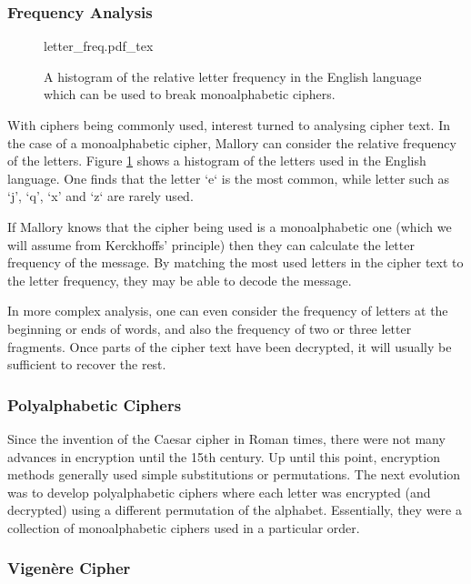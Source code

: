 \subsubsection*{Frequency Analysis}

\begin{figure}[t]
	\centering
	\def\svgwidth{0.6\textwidth}
   	{letter_freq.pdf_tex}
   	\caption[Relative letter frequency in the English language]{A histogram of the relative letter frequency in the English language which can be used to break monoalphabetic ciphers.}
   	\label{fig:letter_freq}
\end{figure}

With ciphers being commonly used, interest turned to analysing cipher text. In the case of a monoalphabetic cipher, Mallory can consider the relative frequency of the letters. Figure \ref{fig:letter_freq} shows a histogram of the letters used in the English language. One finds that the letter `e`  is the most common, while letter such as `j', `q', `x' and `z` are rarely used.

If Mallory knows that the cipher being used is a monoalphabetic one (which we will assume from Kerckhoffs' principle) then they can calculate the letter frequency of the message. By matching the most used letters in the cipher text to the letter frequency, they may be able to decode the message. 

In more complex analysis, one can even consider the frequency of letters at the beginning or ends of words, and also the frequency of two or three letter fragments. Once parts of the cipher text have been decrypted, it will usually be sufficient to recover the rest.

\subsubsection{Polyalphabetic Ciphers}

Since the invention of the Caesar cipher in Roman times, there were not many advances in encryption until the 15th century. Up until this point, encryption methods generally used simple substitutions or permutations. The next evolution was to develop polyalphabetic ciphers where each letter was encrypted (and decrypted) using a different permutation of the alphabet. Essentially, they were a collection of monoalphabetic ciphers used in a particular order.

\subsubsection*{Vigen\`{e}re Cipher}

